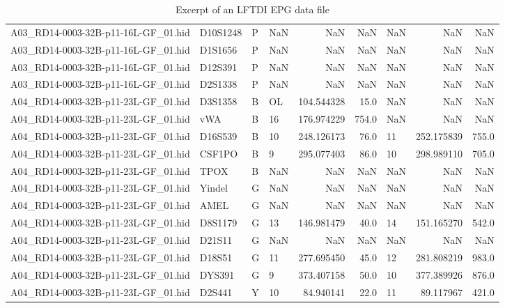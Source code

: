 \begin{landscape}
\begin{table}
\begin{tabular}{llllrrlrr}
A03\_RD14-0003-32B-p11-16L-GF\_01.hid & D10S1248 &   P &      NaN &        NaN &       NaN &      NaN &        NaN &       NaN \\
A03\_RD14-0003-32B-p11-16L-GF\_01.hid &  D1S1656 &   P &      NaN &        NaN &       NaN &      NaN &        NaN &       NaN \\
A03\_RD14-0003-32B-p11-16L-GF\_01.hid &  D12S391 &   P &      NaN &        NaN &       NaN &      NaN &        NaN &       NaN \\
A03\_RD14-0003-32B-p11-16L-GF\_01.hid &  D2S1338 &   P &      NaN &        NaN &       NaN &      NaN &        NaN &       NaN \\
A04\_RD14-0003-32B-p11-23L-GF\_01.hid &  D3S1358 &   B &       OL & 104.544328 &      15.0 &      NaN &        NaN &       NaN \\
A04\_RD14-0003-32B-p11-23L-GF\_01.hid &      vWA &   B &       16 & 176.974229 &     754.0 &      NaN &        NaN &       NaN \\
A04\_RD14-0003-32B-p11-23L-GF\_01.hid &  D16S539 &   B &       10 & 248.126173 &      76.0 &       11 & 252.175839 &     755.0 \\
A04\_RD14-0003-32B-p11-23L-GF\_01.hid &   CSF1PO &   B &        9 & 295.077403 &      86.0 &       10 & 298.989110 &     705.0 \\
A04\_RD14-0003-32B-p11-23L-GF\_01.hid &     TPOX &   B &      NaN &        NaN &       NaN &      NaN &        NaN &       NaN \\
A04\_RD14-0003-32B-p11-23L-GF\_01.hid &   Yindel &   G &      NaN &        NaN &       NaN &      NaN &        NaN &       NaN \\
A04\_RD14-0003-32B-p11-23L-GF\_01.hid &     AMEL &   G &      NaN &        NaN &       NaN &      NaN &        NaN &       NaN \\
A04\_RD14-0003-32B-p11-23L-GF\_01.hid &  D8S1179 &   G &       13 & 146.981479 &      40.0 &       14 & 151.165270 &     542.0 \\
A04\_RD14-0003-32B-p11-23L-GF\_01.hid &   D21S11 &   G &      NaN &        NaN &       NaN &      NaN &        NaN &       NaN \\
A04\_RD14-0003-32B-p11-23L-GF\_01.hid &   D18S51 &   G &       11 & 277.695450 &      45.0 &       12 & 281.808219 &     983.0 \\
A04\_RD14-0003-32B-p11-23L-GF\_01.hid &   DYS391 &   G &        9 & 373.407158 &      50.0 &       10 & 377.389926 &     876.0 \\
A04\_RD14-0003-32B-p11-23L-GF\_01.hid &   D2S441 &   Y &       10 &  84.940141 &      22.0 &       11 &  89.117967 &     421.0 \\
\bottomrule
\end{tabular}
\caption{Excerpt of an LFTDI EPG data file}
\label{table:Excerpt of an LFTDI EPG data file}
\end{table}
\end{landscape}


